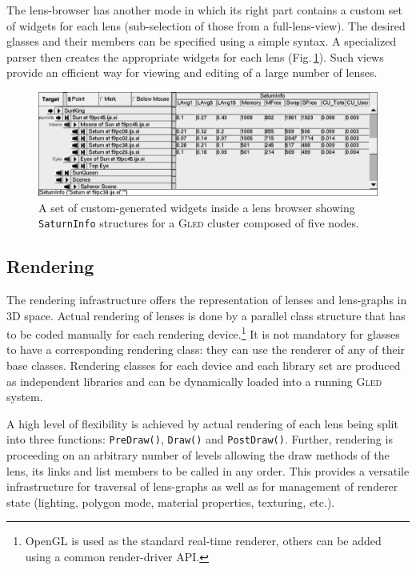 \documentclass[final]{siamltex}
\def\gled{\textsc{Gled}\xspace}
\def\smalltt#1{{\small\texttt{#1}}}
\def\foottt#1{{\footnotesize\texttt{#1}}}
\begin{document}
The lens-browser has another mode in which its right part contains a
custom set of widgets for each lens (sub-selection of those from a
full-lens-view).  The desired glasses and their members can be
specified using a simple syntax.  A specialized parser then creates
the appropriate widgets for each lens (Fig.\,\ref{fig:custom_view}).
Such views provide an efficient way for viewing and editing of a large
number of lenses.

\begin{figure}
  \centering
  \includegraphics[width=\textwidth]{figs/custom_view}
  \caption{A set of custom-generated widgets inside a lens browser
    showing \foottt{SaturnInfo} structures for a \gled cluster
    composed of five nodes.}
  \label{fig:custom_view}
\end{figure}


\subsection{Rendering}

The rendering infrastructure offers the representation of lenses and
lens-graphs in 3D space. Actual rendering of lenses is done by a
parallel class structure that has to be coded manually for each
rendering device.\footnote{OpenGL is used as the standard real-time
  renderer, others can be added using a common render-driver API.}
It is not mandatory for glasses to have a corresponding rendering
class: they can use the renderer of any of their base classes.
Rendering classes for each device and each library set are produced as
independent libraries and can be dynamically loaded into a running
\gled system.

A high level of flexibility is achieved by actual rendering of each
lens being split into three functions: \smalltt{PreDraw()},
\smalltt{Draw()} and \smalltt{PostDraw()}. Further, rendering is
proceeding on an arbitrary number of levels allowing the draw methods
of the lens, its links and list members to be called in any order.
This provides a versatile infrastructure for traversal of lens-graphs
as well as for management of renderer state (lighting, polygon mode,
material properties, texturing, etc.).
\end{document}
